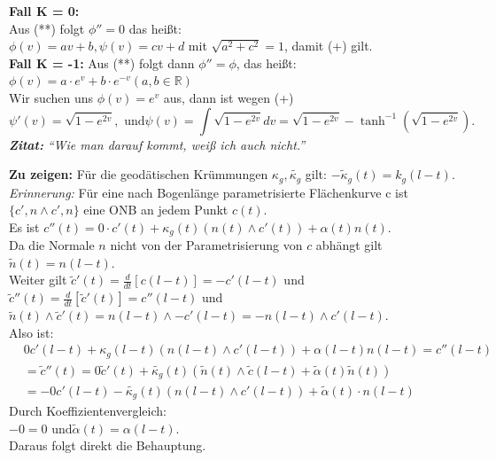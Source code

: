 \begin{problem}[2b]

  \textbf{Fall K = 0:} \\
  Aus (**) folgt \( \phi'' = 0 \) das heißt: \\
  \( \phi(v) = av + b, \psi(v) = cv + d \) mit \( \sqrt{ a^2 + c^2} = 1 \), damit (+) gilt. \\


  \textbf{Fall K = -1:} Aus (**) folgt dann \( \phi'' = \phi \), das heißt: \\
  \( \phi(v) = a \cdot e^v + b \cdot e^{-v} (a,b \in \mathbb{R}) \) \\
  Wir suchen uns \( \phi(v) = e^v \) aus, dann ist wegen (+)
  \begin{equation*}
    \psi'(v) = \sqrt{ 1- e^{2v}}, \text{ und} \psi(v) = \int{ \sqrt{ 1 - e^{2v}}}dv = \sqrt{ 1 - e^{2v}} -\tanh^{-1}(\sqrt{ 1- e^{2v}}).
  \end{equation*}
  \emph{\textbf{Zitat:}} \emph{``Wie man darauf kommt, weiß ich auch nicht.''}

\end{problem}

\begin{problem}[3]
  \textbf{Zu zeigen:} Für die geodätischen Krümmungen \( \kappa_g, \tilde{\kappa_g} \) gilt: \( -\tilde{\kappa}_g(t) = k_g(l-t) \). \\
  \emph{Erinnerung:} Für eine nach Bogenlänge parametrisierte Flächenkurve c ist \( \{ c', n \land c', n \} \) eine ONB an jedem Punkt \( c(t) \). \\
  Es ist \( c''(t) = 0 \cdot c'(t) + \kappa_g(t)(n(t) \land c'(t)) + \alpha(t) n(t) \). \\
  Da die Normale \( n \) nicht von der Parametrisierung von \( c \) abhängt gilt \( \tilde{n}(t) = n(l-t) \). \\
  Weiter gilt \( \tilde{c}'(t) = \frac{d}{dt}[c(l-t)] = - c'(l-t) \) und \\
  \( \tilde{c}''(t) = \frac{d}{dt}[\tilde{c}'(t)] = c''(l-t) \) und \\
  \( \tilde{n}(t) \land \tilde{c}'(t) = n(l-t) \land - c'(l-t) = -n (l-t) \land c'(l-t) \). \\
  Also ist:
  \begin{align*}
    & 0c'(l-t) + \kappa_g(l-t)(n(l-t) \land c'(l-t)) + \alpha(l-t)n(l-t) = c''(l-t) \\
    &= \tilde{c}''(t) = 0\tilde{c}'(t) + \tilde{\kappa_g}(t)(\tilde{n}(t) \land \tilde{c}(l-t) + \tilde{\alpha}(t) \tilde{n}(t)) \\
    &= -0 c'(l-t) - \tilde{\kappa_g}(t)(n(l-t) \land c'(l-t)) + \tilde{\alpha}(t) \cdot n(l-t)
  \end{align*}
  Durch Koeffizientenvergleich: \\
  \( -0 = 0 \text{ und} \tilde{\alpha}(t) = \alpha(l-t) \). \\
  Daraus folgt direkt die Behauptung.
\end{problem}



